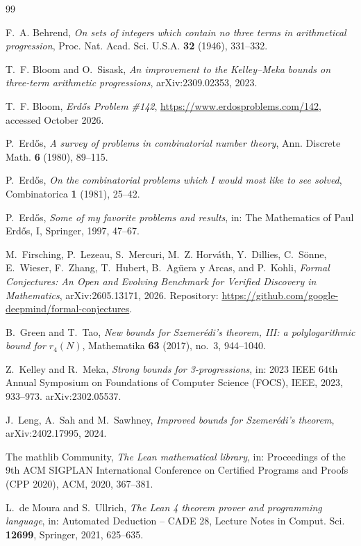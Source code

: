 \documentclass[11pt]{amsart}
\theoremstyle{plain}
\theoremstyle{definition}
\begin{document}
\begin{thebibliography}{99}

F.~A. Behrend, \emph{On sets of integers which contain no three terms in arithmetical progression}, Proc. Nat. Acad. Sci. U.S.A. \textbf{32} (1946), 331--332.

T.~F. Bloom and O.~Sisask, \emph{An improvement to the Kelley--Meka bounds on three-term arithmetic progressions}, arXiv:2309.02353, 2023.

T.~F. Bloom, \emph{Erd\H{o}s Problem \#142}, \url{https://www.erdosproblems.com/142}, accessed October 2026.

P.~Erd\H{o}s, \emph{A survey of problems in combinatorial number theory}, Ann. Discrete Math. \textbf{6} (1980), 89--115.

P.~Erd\H{o}s, \emph{On the combinatorial problems which I would most like to see solved}, Combinatorica \textbf{1} (1981), 25--42.

P.~Erd\H{o}s, \emph{Some of my favorite problems and results}, in: The Mathematics of Paul Erd\H{o}s, I, Springer, 1997, 47--67.

M.~Firsching, P.~Lezeau, S.~Mercuri, M.~Z. Horv\'ath, Y.~Dillies, C.~S\"onne, E.~Wieser, F.~Zhang, T.~Hubert, B.~Ag\"uera y Arcas, and P.~Kohli, \emph{Formal Conjectures: An Open and Evolving Benchmark for Verified Discovery in Mathematics}, arXiv:2605.13171, 2026. Repository: \url{https://github.com/google-deepmind/formal-conjectures}.

B.~Green and T.~Tao, \emph{New bounds for Szemer\'edi's theorem, III: a polylogarithmic bound for $r_4(N)$}, Mathematika \textbf{63} (2017), no.~3, 944--1040.

Z.~Kelley and R.~Meka, \emph{Strong bounds for 3-progressions}, in: 2023 IEEE 64th Annual Symposium on Foundations of Computer Science (FOCS), IEEE, 2023, 933--973. arXiv:2302.05537.

J.~Leng, A.~Sah and M.~Sawhney, \emph{Improved bounds for Szemer\'edi's theorem}, arXiv:2402.17995, 2024.

The mathlib Community, \emph{The Lean mathematical library}, in: Proceedings of the 9th ACM SIGPLAN International Conference on Certified Programs and Proofs (CPP 2020), ACM, 2020, 367--381.

L.~de Moura and S.~Ullrich, \emph{The Lean 4 theorem prover and programming language}, in: Automated Deduction -- CADE 28, Lecture Notes in Comput. Sci. \textbf{12699}, Springer, 2021, 625--635.


\end{thebibliography}
\end{document}
